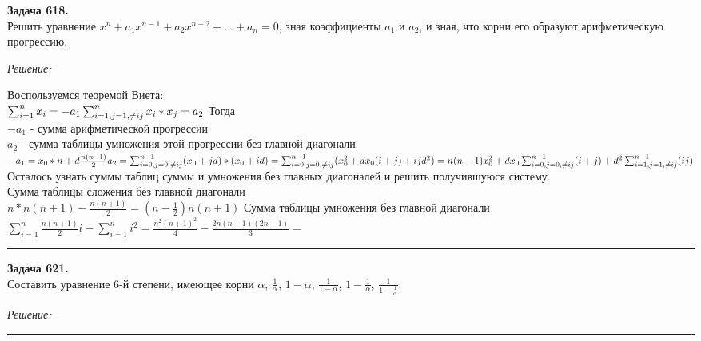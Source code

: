\documentclass[a4paper, 12pt]{article}
\newenvironment{problem}[2][Задача]
    { \begin{mdframed}[backgroundcolor=gray!10] \textbf{#1 #2.} \\}
    {  \end{mdframed}}
\newenvironment{solution}
    {\textit{Решение: }}
    {\noindent\rule{7in}{1.5pt}}
\begin{document}
\begin{problem}{618}
Решить уравнение $x^n+a_1 x^{n-1}+a_2 x^{n-2}+...+a_n = 0$, зная коэффициенты $a_1$ и $a_2$, и зная, что корни его образуют арифметическую прогрессию.
\end{problem}
\begin{solution}

Воспользуемся теоремой Виета: \\
$
\sum_{i=1}^{n}x_i = -a_1 \\
\sum_{i=1, j=1, \neq{i}{j}}^{n}x_i*x_j = a_2 \\
$
Тогда  \\
$-a_1$ - сумма арифметической прогрессии \\
$a_2$ - сумма таблицы умножения этой прогрессии без главной диагонали \\
$
-a_1 = x_0*n + d\frac{n(n-1)}{2} \\
a_2 =
\sum_{i=0, j=0, \neq{i}{j}}^{n - 1}(x_0 + jd)*(x_0 + id) =
\sum_{i=0, j=0, \neq{i}{j}}^{n - 1}(x_0^2 + dx_0(i + j) + ijd^2) = \\
n(n - 1)x_0^2 + dx_0\sum_{i=0, j=0, \neq{i}{j}}^{n - 1}(i + j) + d^2\sum_{i=1, j=1, \neq{i}{j}}^{n - 1}(ij)\\
$
Осталось узнать суммы таблиц суммы и умножения без главных диагоналей и решить получившуюся систему. \\
Сумма таблицы сложения без главной диагонали \\
$n * n(n + 1) - \frac{n(n+1)}{2} = (n-\frac{1}{2})n(n+1)$
Сумма таблицы умножения без главной диагонали \\
$
\sum_{i = 1}^{n}\frac{n(n+1)}{2}i - \sum_{i = 1}^{n}i^2 =
\frac{n^2(n+1)^2}{4} - \frac{2n(n+1)(2n+1)}{3} = 
$

\end{solution} 

\begin{problem}{621}
Составить уравнение $6$-й степени, имеющее корни 
$\alpha$, $\frac{1}{\alpha}$, $1-\alpha$, $\frac{1}{1-\alpha}$, $1-\frac{1}{\alpha}$, $\frac{1}{1-\frac{1}{\alpha}}$.
\end{problem}
\begin{solution}



\end{solution} 
\end{document}
